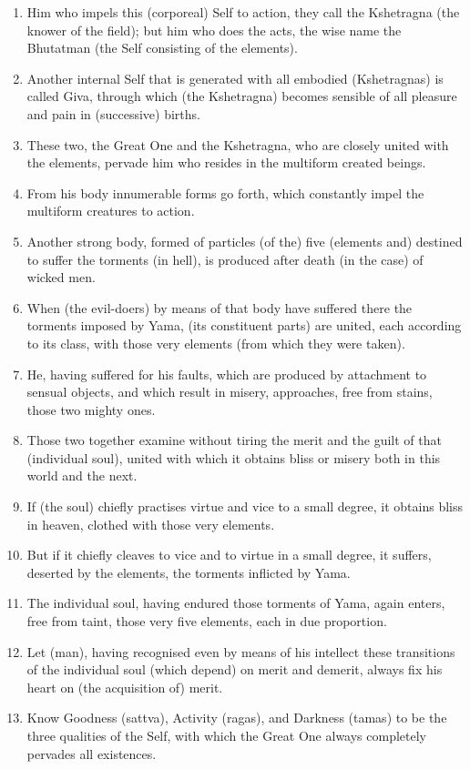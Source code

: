 \begin{enumerate}
\item Him who impels this (corporeal) Self to action, they call the Kshetragna (the knower of the field); but him who does the acts, the wise name the Bhutatman (the Self consisting of the elements).
\item Another internal Self that is generated with all embodied (Kshetragnas) is called Giva, through which (the Kshetragna) becomes sensible of all pleasure and pain in (successive) births.
\item These two, the Great One and the Kshetragna, who are closely united with the elements, pervade him who resides in the multiform created beings.
\item From his body innumerable forms go forth, which constantly impel the multiform creatures to action.
\item Another strong body, formed of particles (of the) five (elements and) destined to suffer the torments (in hell), is produced after death (in the case) of wicked men.
\item When (the evil-doers) by means of that body have suffered there the torments imposed by Yama, (its constituent parts) are united, each according to its class, with those very elements (from which they were taken).
\item He, having suffered for his faults, which are produced by attachment to sensual objects, and which result in misery, approaches, free from stains, those two mighty ones.
\item Those two together examine without tiring the merit and the guilt of that (individual soul), united with which it obtains bliss or misery both in this world and the next.
\item If (the soul) chiefly practises virtue and vice to a small degree, it obtains bliss in heaven, clothed with those very elements.
\item But if it chiefly cleaves to vice and to virtue in a small degree, it suffers, deserted by the elements, the torments inflicted by Yama.
\item The individual soul, having endured those torments of Yama, again enters, free from taint, those very five elements, each in due proportion.
\item Let (man), having recognised even by means of his intellect these transitions of the individual soul (which depend) on merit and demerit, always fix his heart on (the acquisition of) merit.
\item Know Goodness (sattva), Activity (ragas), and Darkness (tamas) to be the three qualities of the Self, with which the Great One always completely pervades all existences.

\end{enumerate}

